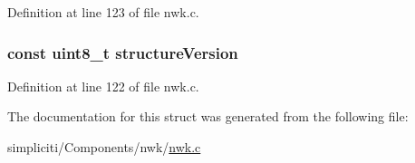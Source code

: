 \-Definition at line 123 of file nwk.\-c.

\hypertarget{structpersistentContext__t_abaeac73e5d38f919c1377241bb5ad908}{
\subsubsection[{structure\-Version}]{\setlength{\rightskip}{0pt plus 5cm}const {\bf uint8\-\_\-t} {\bf structure\-Version}}}\label{structpersistentContext__t_abaeac73e5d38f919c1377241bb5ad908}


\-Definition at line 122 of file nwk.\-c.



\-The documentation for this struct was generated from the following file\-:\begin{DoxyCompactItemize}
\item 
simpliciti/\-Components/nwk/\hyperlink{nwk_8c}{nwk.\-c}\end{DoxyCompactItemize}
